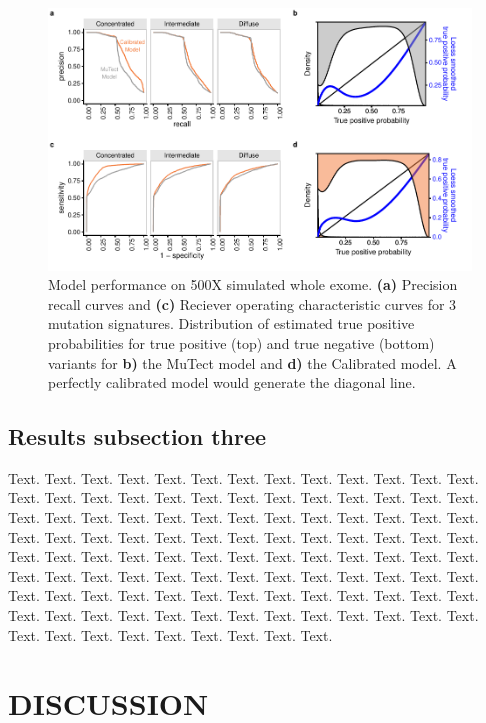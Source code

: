 \documentclass[a4,center,fleqn]{NAR}
\begin{document}
\begin{figure}[t]
\begin{center}
\includegraphics{figures/fig2.pdf}
\end{center}
\caption{Model performance on 500X simulated whole exome.
\textbf{(a)} Precision recall curves and \textbf{(c)} Reciever operating characteristic curves for 3 mutation signatures.
Distribution of estimated true positive probabilities for true positive (top) and true negative (bottom) variants for \textbf{b)} the MuTect model and \textbf{d)} the Calibrated model.
A perfectly calibrated model would generate the diagonal line.
}
\label{NAR-fig2}
\end{figure}


\subsection{Results subsection three}

Text. Text. Text. Text. Text. Text. Text. Text. Text. Text. Text.
Text. Text. Text. Text. Text. Text. Text. Text. Text. Text. Text.
Text. Text. Text. Text. Text. Text. Text. Text. Text. Text. Text.
Text. Text. Text. Text. Text. Text. Text. Text. Text. Text. Text.
Text. Text. Text. Text. Text. Text. Text. Text. Text. Text. Text.
Text. Text. Text. Text. Text. Text. Text. Text. Text. Text. Text.
Text. Text. Text. Text. Text. Text. Text. Text. Text. Text. Text.
Text. Text. Text. Text. Text. Text. Text. Text. Text. Text. Text.
Text. Text. Text. Text. Text. Text. Text. Text. Text. Text. Text.
Text. Text. Text. Text. Text. Text. Text. Text. Text. Text. Text.
Text. Text. Text.


\section{DISCUSSION}
\end{document}
